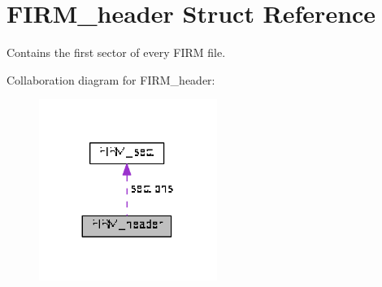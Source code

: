 \hypertarget{struct_f_i_r_m__header}{}\section{F\+I\+R\+M\+\_\+header Struct Reference}
\label{struct_f_i_r_m__header}


Contains the first sector of every F\+I\+R\+M file.  




Collaboration diagram for F\+I\+R\+M\+\_\+header\+:\nopagebreak
\begin{figure}[H]
\begin{center}
\leavevmode
\includegraphics[width=164pt]{struct_f_i_r_m__header__coll__graph}
\end{center}
\end{figure}
